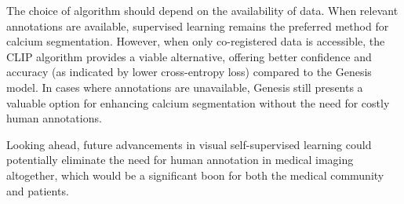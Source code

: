 \documentclass[a4paper,11pt,oneside]{report}
\begin{document}
The choice of algorithm should depend on the availability of data. When relevant annotations are available, supervised learning remains the preferred method for calcium segmentation. However, when only co-registered data is accessible, the CLIP algorithm provides a viable alternative, offering better confidence and accuracy (as indicated by lower cross-entropy loss) compared to the Genesis model. In cases where annotations are unavailable, Genesis still presents a valuable option for enhancing calcium segmentation without the need for costly human annotations.

Looking ahead, future advancements in visual self-supervised learning could potentially eliminate the need for human annotation in medical imaging altogether, which would be a significant boon for both the medical community and patients.



\end{document}

